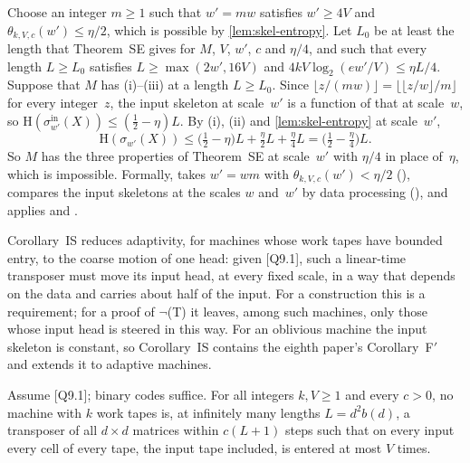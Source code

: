 \begin{outline}
Choose an integer $m\ge1$ such that $w'=mw$ satisfies $w'\ge4V$ and $\theta_{k,V,c}(w')\le\eta/2$, which is possible by
\cref{lem:skel-entropy}. Let $L_0$ be at least the length that Theorem~SE gives for $M$, $V$, $w'$, $c$ and $\eta/4$,
and such that every length $L\ge L_0$ satisfies $L\ge\max(2w',16V)$ and $4kV\log_2(ew'/V)\le\eta L/4$. Suppose that $M$
has (i)--(iii) at a length $L\ge L_0$. Since $\lfloor z/(mw)\rfloor=\lfloor\lfloor z/w\rfloor/m\rfloor$ for every
integer~$z$, the input skeleton at scale~$w'$ is a function of that at scale~$w$, so
$\mathrm H(\sigma^{\mathrm{in}}_{w'}(X))\le(\frac12-\eta)L$. By (i), (ii) and \cref{lem:skel-entropy} at scale~$w'$,
\[
  \mathrm H(\sigma_{w'}(X))\le\bigl(\tfrac12-\eta\bigr)L+\tfrac\eta2L+\tfrac\eta4L=\bigl(\tfrac12-\tfrac\eta4\bigr)L .
\]
So $M$ has the three properties of Theorem~SE at scale~$w'$ with $\eta/4$ in place of~$\eta$, which is impossible.
Formally,  takes $w'=wm$ with $\theta_{k,V,c}(w')<\eta/2$ (),
compares the input skeletons at the scales $w$ and~$w'$ by data processing (), and
applies  and .
\end{outline}

Corollary~IS reduces adaptivity, for machines whose work tapes have bounded entry, to the coarse motion of one head:
given [Q9.1], such a linear-time transposer must move its input head, at every fixed scale, in a way that depends on the
data and carries about half of the input. For a construction this is a requirement; for a proof of $\neg$(T) it leaves,
among such machines, only those whose input head is steered in this way. For an oblivious machine the input skeleton is
constant, so Corollary~IS contains the eighth paper's Corollary~F$'$~\cite[Corollary~6.3]{BoundedNesting2026} and
extends it to adaptive machines.

\begin{corollary}\label{cor:RV}
Assume [Q9.1]; binary codes suffice. For all integers $k,V\ge1$ and every $c>0$, no machine with $k$ work tapes is, at
infinitely many lengths $L=d^2b(d)$, a transposer of all $d\times d$ matrices within $c(L+1)$ steps such that on every
input every cell of every tape, the input tape included, is entered at most $V$ times.
\end{corollary}

